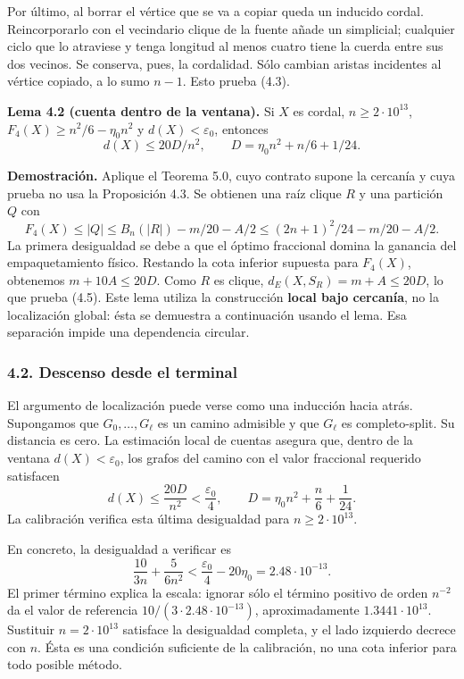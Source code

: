\documentclass[spanish,11pt,a4paper]{article}
\begin{document}
Por último, al borrar el vértice que se va a copiar queda un inducido cordal. Reincorporarlo con el vecindario clique de la fuente añade un simplicial; cualquier ciclo que lo atraviese y tenga longitud al menos cuatro tiene la cuerda entre sus dos vecinos. Se conserva, pues, la cordalidad. Sólo cambian aristas incidentes al vértice copiado, a lo sumo \(n-1\). Esto prueba (4.3).


\textbf{Lema 4.2 (cuenta dentro de la ventana).} Si \(X\) es cordal, \(n\ge2\cdot10^{13}\), \(F_4(X)\ge n^2/6-\eta_0n^2\) y \(d(X)<\varepsilon_0\), entonces \[
d(X)\le20D/n^2,\qquad D=\eta_0n^2+n/6+1/24.
\tag{4.5}
\]

\textbf{Demostración.} Aplique el Teorema 5.0, cuyo contrato supone la cercanía y cuya prueba no usa la Proposición 4.3. Se obtienen una raíz clique \(R\) y una partición \(Q\) con \[
F_4(X)\le |Q|\le B_n(|R|)-m/20-A/2
\le (2n+1)^2/24-m/20-A/2.
\] La primera desigualdad se debe a que el óptimo fraccional domina la ganancia del empaquetamiento físico. Restando la cota inferior supuesta para \(F_4(X)\), obtenemos \(m+10A\le20D\). Como \(R\) es clique, \(d_E(X,S_R)=m+A\le20D\), lo que prueba (4.5). Este lema utiliza la construcción \textbf{local bajo cercanía}, no la localización global: ésta se demuestra a continuación usando el lema. Esa separación impide una dependencia circular.

\subsubsection{4.2. Descenso desde el terminal}\label{descenso-desde-el-terminal}

El argumento de localización puede verse como una inducción hacia atrás. Supongamos que \(G_0,\ldots,G_\ell\) es un camino admisible y que \(G_\ell\) es completo-split. Su distancia es cero. La estimación local de cuentas asegura que, dentro de la ventana \(d(X)<\varepsilon_0\), los grafos del camino con el valor fraccional requerido satisfacen \[
d(X)\le\frac{20D}{n^2}<\frac{\varepsilon_0}{4},\qquad
D=\eta_0n^2+\frac n6+\frac1{24}.
\tag{4.6}
\] La calibración verifica esta última desigualdad para \(n\ge2\cdot10^{13}\).

En concreto, la desigualdad a verificar es \[
\frac{10}{3n}+\frac{5}{6n^2}<\frac{\varepsilon_0}{4}-20\eta_0
=2.48\cdot10^{-13}.
\tag{4.6a}
\] El primer término explica la escala: ignorar sólo el término positivo de orden \(n^{-2}\) da el valor de referencia \(10/(3\cdot2.48\cdot10^{-13})\), aproximadamente \(1.3441\cdot10^{13}\). Sustituir \(n=2\cdot10^{13}\) satisface la desigualdad completa, y el lado izquierdo decrece con \(n\). Ésta es una condición suficiente de la calibración, no una cota inferior para todo posible método.
\end{document}
